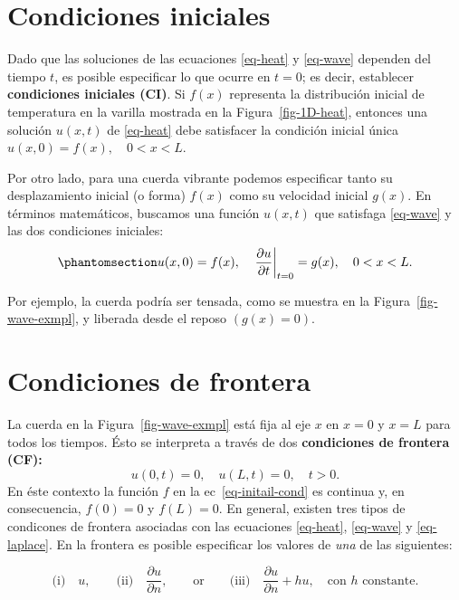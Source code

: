 \documentclass[
  spanish,
  us-letterpaper,
  DIV=11,
  numbers=noendperiod]{scrreprt}
\theoremstyle{definition}
\theoremstyle{plain}
\theoremstyle{remark}
\begin{document}
\section{Condiciones iniciales}\label{condiciones-iniciales}

Dado que las soluciones de las ecuaciones \ref{eq-heat} y \ref{eq-wave}
dependen del tiempo \(t\), es posible especificar lo que ocurre en
\(t = 0\); es decir, establecer \textbf{condiciones iniciales (CI)}. Si
\(f(x)\) representa la distribución inicial de temperatura en la varilla
mostrada en la Figura~\ref{fig-1D-heat}, entonces una solución
\(u(x, t)\) de \ref{eq-heat} debe satisfacer la condición inicial única
\(u(x, 0) = f(x), \quad 0 < x < L\).

Por otro lado, para una cuerda vibrante podemos especificar tanto su
desplazamiento inicial (o forma) \(f(x)\) como su velocidad inicial
\(g(x)\). En términos matemáticos, buscamos una función \(u(x, t)\) que
satisfaga \ref{eq-wave} y las dos condiciones iniciales:
\begin{equation}\phantomsection\label{eq-initail-cond}{
u(x, 0) = f(x), \quad \left. \frac{\partial u}{\partial t} \right|_{t=0} = g(x), \quad 0 < x < L.
}\end{equation}

Por ejemplo, la cuerda podría ser tensada, como se muestra en la
Figura~\ref{fig-wave-exmpl}, y liberada desde el reposo \((g(x)=0)\).

\section{Condiciones de frontera}\label{condiciones-de-frontera}

La cuerda en la Figura~\ref{fig-wave-exmpl} está fija al eje \(x\) en
\(x=0\) y \(x=L\) para todos los tiempos. Ésto se interpreta a través de
dos \textbf{condiciones de frontera (CF):} \[
u(0,t) = 0, \quad u(L,t)=0, \quad t>0.
\] En éste contexto la función \(f\) en la ec~\ref{eq-initail-cond} es
continua y, en consecuencia, \(f(0)=0\) y \(f(L)=0\). En general,
existen tres tipos de condicones de frontera asociadas con las
ecuaciones \ref{eq-heat}, \ref{eq-wave} y \ref{eq-laplace}. En la
frontera es posible especificar los valores de \emph{una} de las
siguientes:

\[
\text{(i)}\quad u, \qquad \text{(ii)}\quad \dfrac{\partial u}{\partial n},\qquad \text{or}\qquad \text{(iii)}\quad \dfrac{\partial u}{\partial n} + hu,\quad \text{con $h$ constante.}
\]
\end{document}
